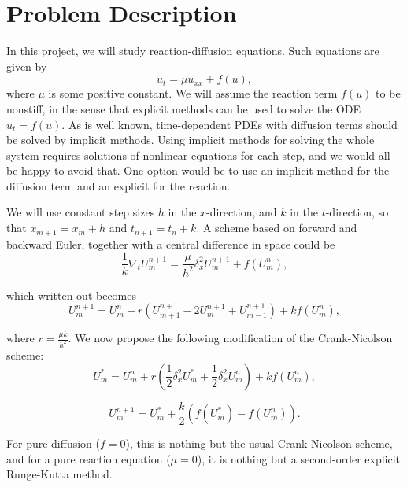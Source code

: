 \chapter{Problem Description}

In this project, we will study reaction-diffusion equations. Such equations are given by
\begin{equation}
    u_t = \mu u_{xx} + f(u),
\end{equation}
where $\mu$ is some positive constant. We will assume the reaction term $f(u)$ to be nonstiff, in the sense that explicit methods can be used to solve the ODE $u_t = f(u)$. As is well known, time-dependent PDEs with diffusion terms should be solved by implicit methods. Using implicit methods for solving the whole system requires solutions of nonlinear equations for each step, and we would all be happy to avoid that. One option would be to use an implicit method for the diffusion term and an explicit for the reaction.

We will use constant step sizes $h$ in the $x$-direction, and $k$ in the $t$-direction, so that $x_{m+1} = x_m + h$ and $t_{n+1} = t_n + k$. A scheme based on forward and backward Euler, together with a central difference in space could be
\begin{equation}
    \frac{1}{k} \nabla_t U_m^{n+1} = \frac{\mu}{h^2} \delta_x^2 U_m^{n+1} + f(U_m^n),
\end{equation}

which written out becomes
\begin{equation}
    U_m^{n+1} = U_m^n + r \left( U_{m+1}^{n+1} - 2 U_m^{n+1} + U_{m-1}^{n+1} \right) + k f(U_m^n),
\end{equation}

where $r = \frac{\mu k}{h^2}$. We now propose the following modification of the Crank-Nicolson scheme:
\begin{equation}
    U_m^* = U_m^n + r \left( \frac{1}{2} \delta_x^2 U_m^* + \frac{1}{2} \delta_x^2 U_m^n \right) + k f(U_m^n),
\end{equation}

\begin{equation}
    U_m^{n+1} = U_m^* + \frac{k}{2} \left( f(U_m^*) - f(U_m^n) \right).
\end{equation}

For pure diffusion ($f = 0$), this is nothing but the usual Crank-Nicolson scheme, and for a pure reaction equation ($\mu = 0$), it is nothing but a second-order explicit Runge-Kutta method.

